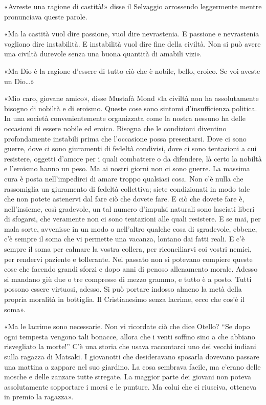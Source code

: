 \documentclass[
a5paper, %
10pt, %
twoside, 
onecolumn, %
openany, %
]{memoir}
\begin{document}
«Avreste una ragione di castità!» disse il Selvaggio arrossendo leggermente mentre pronunciava queste parole.

«Ma la castità vuol dire passione, vuol dire nevrastenia. E passione e nevrastenia vogliono dire instabilità. E instabilità vuol dire fine della civiltà. Non si può avere una civiltà durevole senza una buona quantità di amabili vizi».

«Ma Dio è la ragione d’essere di tutto ciò che è nobile, bello, eroico. Se voi aveste un Dio…»

«Mio caro, giovane amico», disse Mustafà Mond «la civiltà non ha assolutamente bisogno di nobiltà e di eroismo. Queste cose sono sintomi d’insufficienza politica. In una società convenientemente organizzata come la nostra nessuno ha delle occasioni di essere nobile ed eroico. Bisogna che le condizioni diventino profondamente instabili prima che l’occasione possa presentarsi. Dove ci sono guerre, dove ci sono giuramenti di fedeltà condivisi, dove ci sono tentazioni a cui resistere, oggetti d’amore per i quali combattere o da difendere, là certo la nobiltà e l’eroismo hanno un peso. Ma ai nostri giorni non ci sono guerre. La massima cura è posta nell’impedirci di amare troppo qualsiasi cosa. Non c’è nulla che rassomiglia un giuramento di fedeltà collettiva; siete condizionati in modo tale che non potete astenervi dal fare ciò che dovete fare. E ciò che dovete fare è, nell’insieme, così gradevole, un tal numero d’impulsi naturali sono lasciati liberi di sfogarsi, che veramente non ci sono tentazioni alle quali resistere. E se mai, per mala sorte, avvenisse in un modo o nell’altro qualche cosa di sgradevole, ebbene, c’è sempre il soma che vi permette una vacanza, lontano dai fatti reali. E c’è sempre il soma per calmare la vostra collera, per riconciliarvi coi vostri nemici, per rendervi paziente e tollerante. Nel passato non si potevano compiere queste cose che facendo grandi sforzi e dopo anni di penoso allenamento morale. Adesso si mandano giù due o tre compresse di mezzo grammo, e tutto è a posto. Tutti possono essere virtuosi, adesso. Si può portare indosso almeno la metà della propria moralità in bottiglia. Il Cristianesimo senza lacrime, ecco che cos’è il soma».

«Ma le lacrime sono necessarie. Non vi ricordate ciò che dice Otello? “Se dopo ogni tempesta vengono tali bonacce, allora che i venti soffino sino a che abbiano risvegliato la morte!” C’è una storia che usava raccontarci uno dei vecchi indiani sulla ragazza di Matsaki. I giovanotti che desideravano sposarla dovevano passare una mattina a zappare nel suo giardino. La cosa sembrava facile, ma c’erano delle mosche e delle zanzare tutte stregate. La maggior parte dei giovani non poteva assolutamente sopportare i morsi e le punture. Ma colui che ci riusciva, otteneva in premio la ragazza».
\end{document}
